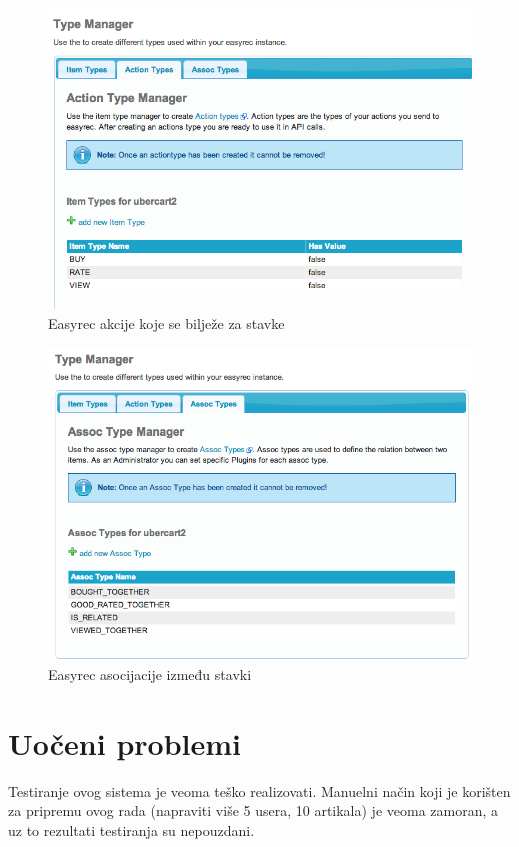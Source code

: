 \documentclass[times, utf8, seminar]{fit}
\begin{document}
{{\begin{figure}[H]
\centering
\includegraphics[width=12cm]{img/easyrec_7_item_actions.png}
\caption{Easyrec akcije koje se bilježe za stavke}
\end{figure}

\begin{figure}[H]
\centering
\includegraphics[width=12cm]{img/easyrec_8_item_assoc.png}
\caption{Easyrec asocijacije između stavki}
\end{figure}

\chapter{Uočeni problemi}

Testiranje ovog sistema je veoma teško realizovati. Manuelni način koji je korišten za pripremu ovog rada (napraviti više 5 usera, 10 artikala) je veoma zamoran, a uz to rezultati testiranja su nepouzdani.

}}
\end{document}
